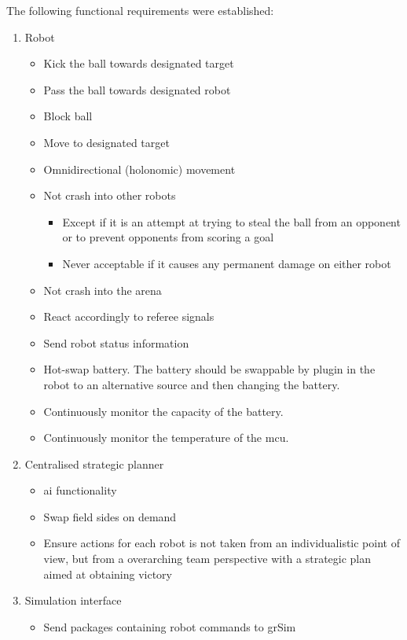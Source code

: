 The following functional requirements were established:
\begin{enumerate}
    \item Robot
    \begin{itemize}
        \item Kick the ball towards designated target
        \item Pass the ball towards designated robot
        \item Block ball
        \item Move to designated target
        \item Omnidirectional (holonomic) movement
        \item Not crash into other robots
        \begin{itemize}
            \item Except if it is an attempt at trying to steal the ball from an opponent or to prevent opponents from scoring a goal
            \item Never acceptable if it causes any permanent damage on either robot
        \end{itemize}
        \item Not crash into the arena
        \item React accordingly to referee signals
        \item Send robot status information
        \item Hot-swap battery. The battery should be swappable by plugin in the robot to an alternative source and then changing the battery.
        \item Continuously monitor the capacity of the battery.
        \item Continuously monitor the temperature of the \ac{mcu}.
    \end{itemize}
    \item Centralised strategic planner
    \begin{itemize}
        \item \ac{ai} functionality
        \item Swap field sides on demand
        \item Ensure actions for each robot is not taken from an individualistic point of view, but from a overarching team perspective with a strategic plan aimed at obtaining victory
    \end{itemize}
    \item Simulation interface
    \begin{itemize}
        \item Send packages containing robot commands to grSim

\end{itemize}
\end{enumerate}
